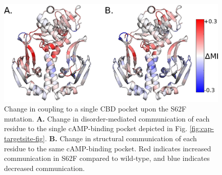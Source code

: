 \documentclass[../main.tex]{subfiles}
\begin{document}
    \begin{figure}[!htb] %
        \centering
        \includegraphics[width=5in]{cap-s62f-deltaMI-fig.eps}
        \caption[Change in coupling to a single CBD pocket upon the S62F mutation.]
            {Change in coupling to a single CBD pocket upon the S62F mutation. \textbf{A.} Change in disorder-mediated communication of each residue to the single cAMP-binding pocket depicted in Fig. \ref{fig:cap-targetsite-fig}. \textbf{B.} Change in structural communication of each residue to the same cAMP-binding pocket. Red indicates increased communication in S62F compared to wild-type, and blue indicates decreased communication.}
        \label{fig:cap-s62f-deltaMI-fig}
    \end{figure} 
\end{document}

